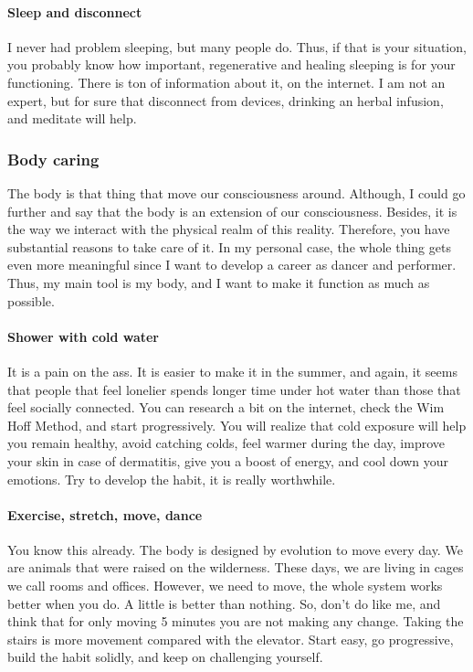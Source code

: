 \documentclass{article}
\begin{document}
\paragraph{Sleep and disconnect}
I never had problem sleeping, but many people do. Thus, if that is your situation, you probably know how important, regenerative and healing sleeping is for your functioning. There is ton of information about it, on the internet. I am not an expert, but for sure that disconnect from devices, drinking an herbal infusion, and meditate will help. 

\subsubsection{Body caring}
\label{subsubsec: Body}

The body is that thing that move our consciousness around. Although, I could go further and say that the body is an extension of our consciousness. Besides, it is the way we interact with the physical realm of this reality. Therefore, you have substantial reasons to take care of it. In my personal case, the whole thing gets even more meaningful since I want to develop a career as dancer and performer. Thus, my main tool is my body, and I want to make it function as much as possible. 
\paragraph{Shower with cold water}
It is a pain on the ass. It is easier to make it in the summer, and again, it seems that people that feel lonelier spends longer time under hot water than those that feel socially connected. You can research a bit on the internet, check the Wim Hoff Method, and start progressively. You will realize that cold exposure will help you remain healthy, avoid catching colds, feel warmer during the day, improve your skin in case of dermatitis, give you a boost of energy, and cool down your emotions. Try to develop the habit, it is really worthwhile.  
\paragraph{Exercise, stretch, move, dance}
You know this already. The body is designed by evolution to move every day. We are animals that were raised on the wilderness. These days, we are living in cages we call rooms and offices. However, we need to move, the whole system works better when you do. A little is better than nothing. So, don’t do like me, and think that for only moving 5 minutes you are not making any change. Taking the stairs is more movement compared with the elevator. Start easy, go progressive, build the habit solidly, and keep on challenging yourself. 
\end{document}
